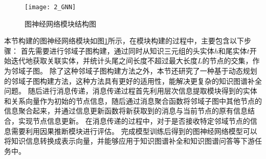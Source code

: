 \documentclass[algorithmlist, AutoFakeBold, AutoFakeSlant, figurelist, tablelist, nomlist, engineering]{seuthesix}
\begin{document}
\begin{figure}
  \centering
  \texttt{[image: 2\_GNN]}
  \caption{图神经网络模块结构图}
  \label{2_GNN}
\end{figure}
本节构建的图神经网络模块如图\ref{2_GNN}所示，在模块构建的过程中，主要包含以下步骤：
首先需要进行邻域子图构建，通过同时从知识三元组的头实体$h$和尾实体$t$开始迭代地获取关联实体，并统计头尾之间长度不超过最大长度$L$的节点的交集，作为邻域子图。
除了这种邻域子图构建方法之外，本节还研究了一种基于动态规划的邻域子图构建方法，这种方法具有更好的适用性，能解决更复杂的知识图谱补全问题。
随后进行消息传递，消息传递过程首先利用层次信息提取模块得到的实体和关系向量作为初始的节点信息，随后通过消息聚合函数将邻域子图中其他节点的信息聚合起来，并通过信息更新函数将新获取到的消息与当前节点的原有信息结合，实现节点信息更新。
在消息传递的过程中，对于是否接收特定邻域节点的信息需要利用因果推断模块进行评估。
完成模型训练后得到的图神经网络模型可以将知识信息转换成表示向量，并能够应用于知识图谱补全和知识图谱问答等下游任务中。
\end{document}
